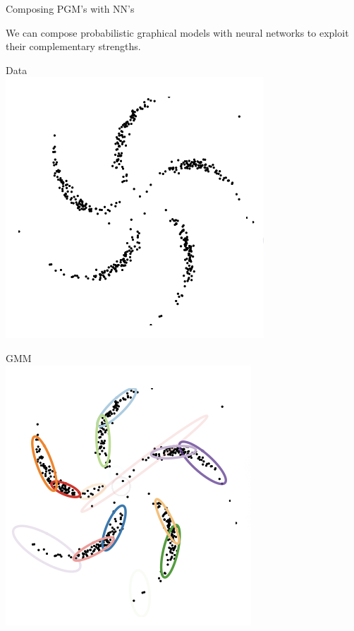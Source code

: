 \documentclass[10pt]{beamer}
\begin{document}
\begin{frame}{Composing PGM's with NN's}

  \begin{minipage}[t][.9\textheight]{\textwidth}
We can compose probabilistic graphical models with neural networks to exploit their complementary strengths. 

\vfill 
  \begin{minipage}[t]{.3\textwidth}
  \begin{center}
  Data  \\
  \includegraphics[width=.7\textwidth]{images/example_data}
  \end{center}
 \end{minipage}  \hfill
  \begin{minipage}[t]{.3\textwidth}
  \begin{center}
  GMM  \\
  \includegraphics[width=.7\textwidth]{images/example_gmm}

\end{center}
\end{minipage}
\end{minipage}
\end{frame}
\end{document}
